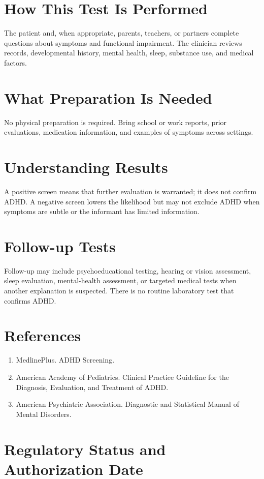 \section*{How This Test Is Performed}
The patient and, when appropriate, parents, teachers, or partners complete questions about symptoms and functional impairment. The clinician reviews records, developmental history, mental health, sleep, substance use, and medical factors.

\section*{What Preparation Is Needed}
No physical preparation is required. Bring school or work reports, prior evaluations, medication information, and examples of symptoms across settings.

\section*{Understanding Results}
A positive screen means that further evaluation is warranted; it does not confirm ADHD. A negative screen lowers the likelihood but may not exclude ADHD when symptoms are subtle or the informant has limited information.

\section*{Follow-up Tests}
Follow-up may include psychoeducational testing, hearing or vision assessment, sleep evaluation, mental-health assessment, or targeted medical tests when another explanation is suspected. There is no routine laboratory test that confirms ADHD.

\section*{References}
\begin{enumerate}
  \item MedlinePlus. ADHD Screening.
  \item American Academy of Pediatrics. Clinical Practice Guideline for the Diagnosis, Evaluation, and Treatment of ADHD.
  \item American Psychiatric Association. Diagnostic and Statistical Manual of Mental Disorders.
\end{enumerate}

\clearpage


\section*{Regulatory Status and Authorization Date}

\clearpage
